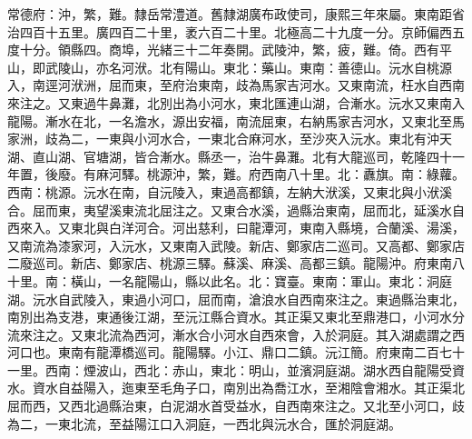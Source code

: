 \begin{pinyinscope}
常德府：沖，繁，難。隸岳常澧道。舊隸湖廣布政使司，康熙三年來屬。東南距省治四百十五里。廣四百二十里，袤六百二十里。北極高二十九度一分。京師偏西五度十分。領縣四。商埠，光緒三十二年奏開。武陵沖，繁，疲，難。倚。西有平山，即武陵山，亦名河洑。北有陽山。東北：藥山。東南：善德山。沅水自桃源入，南逕河洑洲，屈而東，至府治東南，歧為馬家吉河水。又東南流，枉水自西南來注之。又東過牛鼻灘，北別出為小河水，東北匯連山湖，合漸水。沅水又東南入龍陽。漸水在北，一名澹水，源出安福，南流屈東，右納馬家吉河水，又東北至馬家洲，歧為二，一東與小河水合，一東北合麻河水，至沙夾入沅水。東北有沖天湖、直山湖、官塘湖，皆合漸水。縣丞一，治牛鼻灘。北有大龍巡司，乾隆四十一年置，後廢。有麻河驛。桃源沖，繁，難。府西南八十里。北：纛旗。南：綠蘿。西南：桃源。沅水在南，自沅陵入，東過高都鎮，左納大洑溪，又東北與小洑溪合。屈而東，夷望溪東流北屈注之。又東合水溪，過縣治東南，屈而北，延溪水自西來入。又東北與白洋河合。河出慈利，曰龍潭河，東南入縣境，合蘭溪、湯溪，又南流為漆家河，入沅水，又東南入武陵。新店、鄭家店二巡司。又高都、鄭家店二廢巡司。新店、鄭家店、桃源三驛。蘇溪、麻溪、高都三鎮。龍陽沖。府東南八十里。南：橫山，一名龍陽山，縣以此名。北：寶臺。東南：軍山。東北：洞庭湖。沅水自武陵入，東過小河口，屈而南，滄浪水自西南來注之。東過縣治東北，南別出為支港，東通後江湖，至沅江縣合資水。其正渠又東北至鼎港口，小河水分流來注之。又東北流為西河，漸水合小河水自西來會，入於洞庭。其入湖處謂之西河口也。東南有龍潭橋巡司。龍陽驛。小江、鼎口二鎮。沅江簡。府東南二百七十一里。西南：煙波山，西北：赤山，東北：明山，並濱洞庭湖。湖水西自龍陽受資水。資水自益陽入，迤東至毛角子口，南別出為喬江水，至湘陰會湘水。其正渠北屈而西，又西北過縣治東，白泥湖水首受益水，自西南來注之。又北至小河口，歧為二，一東北流，至益陽江口入洞庭，一西北與沅水合，匯於洞庭湖。


\end{pinyinscope}
